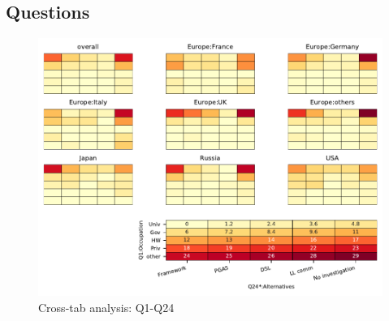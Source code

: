 
\subsection{Questions}


\begin{figure}
\begin{center}
\includegraphics[width=12cm]{../pdfs/Q1-Q24.pdf}
\caption{Cross-tab analysis: Q1-Q24}
\label{fig:Q1-Q24}
\end{center}
\end{figure}
